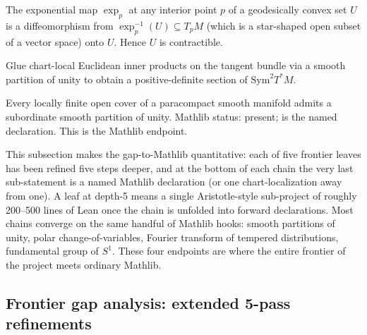 \begin{lemma}
\label{lem:gce-r3-convex-diffeo-ball}
The exponential map $\exp_{p}$ at any interior point $p$ of a
geodesically convex set $U$ is a diffeomorphism from
$\exp_{p}^{-1}(U) \subseteq T_{p}M$ (which is a star-shaped
open subset of a vector space) onto $U$.  Hence $U$ is
contractible.
\leanok\mathlibok
\end{lemma}

\begin{lemma}
\label{lem:gce-r4-riemannian-metric-exists}
Glue chart-local Euclidean inner products on the tangent bundle
via a smooth partition of unity to obtain a positive-definite
section of $\mathrm{Sym}^{2} T^{*} M$.
\leanok\mathlibok
\end{lemma}

\begin{lemma}
\label{lem:gce-r5-smooth-pou}
Every locally finite open cover of a paracompact smooth
manifold admits a subordinate smooth partition of unity.
Mathlib status: present;
is the named declaration.  This is the Mathlib endpoint.
\leanok\mathlibok
\end{lemma}

\begin{layman}
This subsection makes the gap-to-Mathlib quantitative: each of
five frontier leaves has been refined five steps deeper, and at
the bottom of each chain the very last sub-statement is a named
Mathlib declaration (or one chart-localization away from one).
A leaf at depth-5 means a single Aristotle-style sub-project of
roughly 200--500 lines of Lean once the chain is unfolded into
forward declarations.  Most chains converge on the same handful
of Mathlib hooks: smooth partitions of unity, polar
change-of-variables, Fourier transform of tempered
distributions, fundamental group of $S^{1}$.  These four
endpoints are where the entire frontier of the project meets
ordinary Mathlib.
\end{layman}

\subsection{Frontier gap analysis: extended 5-pass refinements}
\label{subsec:frontier-five-pass-extended}

